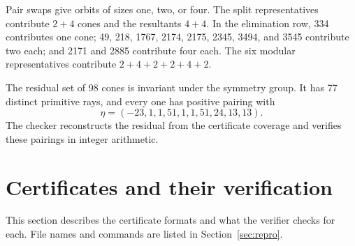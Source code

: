 \documentclass[11pt]{amsart}
\theoremstyle{definition}\newtheorem{definition}[theorem]{Definition}\theoremstyle{remark}\newtheorem{remark}[theorem]{Remark}
\begin{document}
\begin{samepage}
Pair swaps give orbits of sizes one, two, or four. The split representatives contribute $2+4$ cones and the resultants $4+4$. In the elimination row, 334 contributes one cone; 49, 218, 1767, 2174, 2175, 2345, 3494, and 3545 contribute two each; and 2171 and 2885 contribute four each. The six modular representatives contribute $2+4+2+2+4+2$.
\par
\end{samepage}

The residual set of 98 cones is invariant under the symmetry group. It has 77 distinct primitive rays, and every one has positive pairing with
\begin{equation}\label{eq:eta}
 \eta=(-23,1,1,51,1,1,51,24,13,13).
\end{equation}
The checker reconstructs the residual from the certificate coverage and verifies these pairings in integer arithmetic.


\section{Certificates and their verification}\label{sec:cert}
This section describes the certificate formats and what the verifier checks for each. File names and commands are listed in Section~\ref{sec:repro}.
\end{document}

